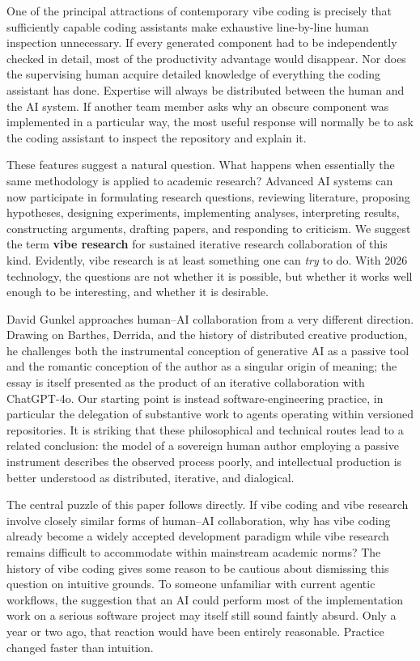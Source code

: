 \documentclass[12pt]{article}
\begin{document}
One of the principal attractions of contemporary vibe coding is precisely that sufficiently capable coding assistants make exhaustive line-by-line human inspection unnecessary. If every generated component had to be independently checked in detail, most of the productivity advantage would disappear.
Nor does the supervising human acquire detailed knowledge of everything the coding assistant has done. Expertise will always be distributed between the human and the AI system. If another team member asks why an obscure component was implemented in a particular way, the most useful response will normally be to ask the coding assistant to inspect the repository and explain it.

These features suggest a natural question. What happens when essentially the same methodology is applied to academic research?
Advanced AI systems can now participate in formulating research questions, reviewing literature, proposing hypotheses, designing experiments, implementing analyses, interpreting results, constructing arguments, drafting papers, and responding to criticism. We suggest the term \textbf{vibe research} for sustained iterative research collaboration of this kind. Evidently, vibe research is at least something one can \textit{try} to do. With 2026 technology, the questions are not whether it is possible, but whether it works well enough to be interesting, and whether it is desirable.

David Gunkel \citeyearpar{gunkel2025prompted} approaches human--AI collaboration from a very different direction. Drawing on Barthes, Derrida, and the history of distributed creative production, he challenges both the instrumental conception of generative AI as a passive tool and the romantic conception of the author as a singular origin of meaning; the essay is itself presented as the product of an iterative collaboration with ChatGPT-4o. Our starting point is instead software-engineering practice, in particular the delegation of substantive work to agents operating within versioned repositories. It is striking that these philosophical and technical routes lead to a related conclusion: the model of a sovereign human author employing a passive instrument describes the observed process poorly, and intellectual production is better understood as distributed, iterative, and dialogical.

The central puzzle of this paper follows directly. If vibe coding and vibe research involve closely similar forms of human--AI collaboration, why has vibe coding already become a widely accepted development paradigm while vibe research remains difficult to accommodate within mainstream academic norms?
The history of vibe coding gives some reason to be cautious about dismissing this question on intuitive grounds. To someone unfamiliar with current agentic workflows, the suggestion that an AI could perform most of the implementation work on a serious software project may itself still sound faintly absurd. Only a year or two ago, that reaction would have been entirely reasonable. Practice changed faster than intuition.
\end{document}
